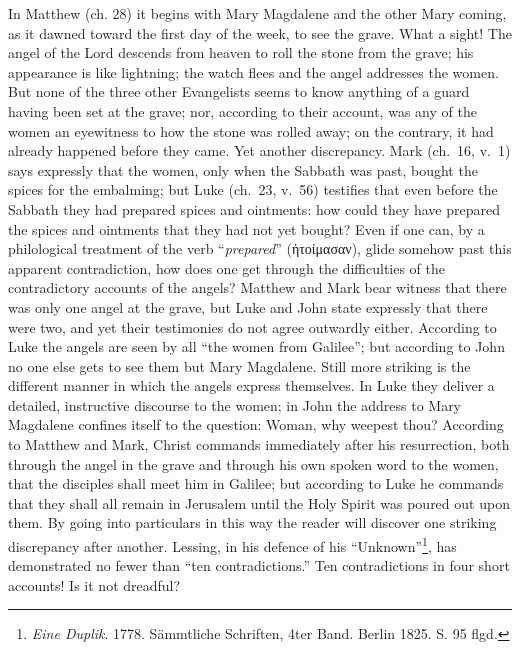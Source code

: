 \documentclass[12pt,a4paper,openany]{book}
\newcommand{\opage}[1]{\marginnote{\footnotesize\textit{[#1]}}}
\begin{document}
In Matthew (ch. 28) it begins with Mary
Magdalene and the other Mary coming, as it dawned toward
the first day of the week, to see the grave. What
a sight! The angel of the Lord descends from heaven to roll the stone
from the grave; his appearance is like lightning; the watch flees
\setcounter{footnote}{0}%
\opage{14}and the angel addresses the women. But none of the three
other Evangelists seems to know anything of a guard
having been set at the grave; nor, according to their account,
was any of the women an eyewitness to how
the stone was rolled away; on the contrary, it had already
happened before they came. Yet another discrepancy. Mark
(ch.\ 16, v.\ 1) says expressly that the women, only when
the Sabbath was past, bought the spices for the embalming;
but Luke (ch.\ 23, v.\ 56) testifies that even before the
Sabbath they had prepared spices and ointments: how could they
have prepared the spices and ointments that they had not yet bought?
Even if one can, by a philological treatment of
the verb ``\emph{prepared}'' (ἡτοίμασαν), glide somehow
past this apparent contradiction, how does
one get through the difficulties of the contradictory
accounts of the angels? Matthew and Mark
bear witness that there was only one angel at the grave,
but Luke and John state expressly that there were two, and yet
their testimonies do not agree outwardly either. According to
Luke the angels are seen by all ``the women from Galilee'';
but according to John no one else gets to see them but
Mary Magdalene. Still more striking is the different
manner in which the angels express themselves. In
Luke they deliver a detailed, instructive discourse to
the women; in John the address to Mary
Magdalene confines itself to the question: Woman, why weepest
thou? According to Matthew and Mark, Christ commands immediately
after his resurrection, both through the angel in the grave
and through his own spoken word to the women, that the disciples
shall meet him in Galilee; but according to Luke he commands
that they shall all remain in Jerusalem until
\setcounter{footnote}{0}%
\opage{15}the Holy Spirit was poured out upon them. By going
into particulars in this way the reader will discover one striking
discrepancy after another. Lessing, in his
defence of his ``Unknown''\footnote[1]{\emph{Eine Duplik}. 1778. Sämmtliche Schriften, 4ter Band. Berlin 1825. S. 95 flgd.}, has demonstrated no fewer
than ``ten contradictions.'' Ten contradictions in four short accounts!
Is it not dreadful?
\end{document}
